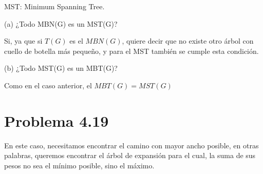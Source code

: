 \documentclass{article}
\begin{document}
MST: Minimum Spanning Tree.

(a) ¿Todo MBN(G) es un MST(G)?

Si, ya que si $T(G)$ es el $MBN(G)$, quiere decir que no existe otro árbol con
cuello de botella más pequeño, y para el MST también se cumple esta condición.

% 
(b) ¿Todo MST(G) es un MBT(G)?

Como en el caso anterior, el $MBT(G) = MST(G)$

\section*{Problema 4.19}

%
%
%
%
%
En este caso, necesitamos encontrar el camino con mayor ancho posible,
en otras palabras, queremos encontrar el árbol de expansión para el cual, la
suma de sus pesos no sea el mínimo posible, sino el máximo.
\end{document}
